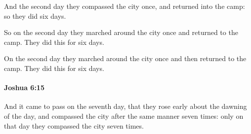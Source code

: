 			\begin{versebox}
					\item[BHS] 
					\item[ASV] And the second day they compassed the city once, and returned into the camp: so they did six days.
					\item[NIV] So on the second day they marched around the city once and returned to the camp. They did this for six days.
					\item[NRSV] On the second day they marched around the city once and then returned to the camp. They did this for six days.
			\end{versebox}

		\paragraph{Joshua 6:15} %
			\label{JOSHUA-6-15}

			And it came to pass on the seventh day, that they rose early about the dawning of the day, and compassed the city after the same manner seven times: only on that day they compassed the city seven times.

